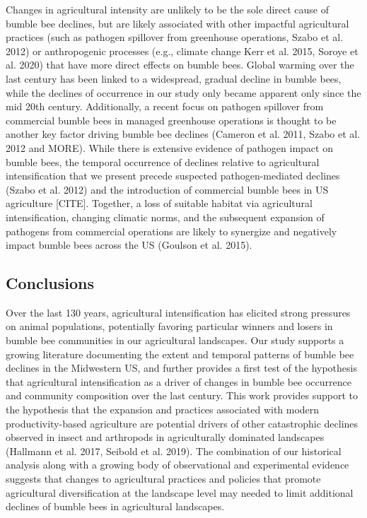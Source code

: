 \documentclass[11pt,]{article}
\begin{document}
Changes in agricultural intensity are unlikely to be the sole direct
cause of bumble bee declines, but are likely associated with other
impactful agricultural practices (such as pathogen spillover from
greenhouse operations, Szabo et al. 2012) or anthropogenic processes
(e.g., climate change Kerr et al. 2015, Soroye et al. 2020) that have
more direct effects on bumble bees. Global warming over the last century
has been linked to a widespread, gradual decline in bumble bees, while
the declines of occurrence in our study only became apparent only since
the mid 20th century. Additionally, a recent focus on pathogen spillover
from commercial bumble bees in managed greenhouse operations is thought
to be another key factor driving bumble bee declines (Cameron et al.
2011, Szabo et al. 2012 and MORE). While there is extensive evidence of
pathogen impact on bumble bees, the temporal occurrence of declines
relative to agricultural intensification that we present precede
suspected pathogen-mediated declines (Szabo et al. 2012) and the
introduction of commercial bumble bees in US agriculture {[}CITE{]}.
Together, a loss of suitable habitat via agricultural intensification,
changing climatic norms, and the subsequent expansion of pathogens from
commercial operations are likely to synergize and negatively impact
bumble bees across the US (Goulson et al. 2015).

\hypertarget{conclusions}{%
\subsection{Conclusions}\label{conclusions}}

Over the last 130 years, agricultural intensification has elicited
strong pressures on animal populations, potentially favoring particular
winners and losers in bumble bee communities in our agricultural
landscapes. Our study supports a growing literature documenting the
extent and temporal patterns of bumble bee declines in the Midwestern
US, and further provides a first test of the hypothesis that
agricultural intensification as a driver of changes in bumble bee
occurrence and community composition over the last century. This work
provides support to the hypothesis that the expansion and practices
associated with modern productivity-based agriculture are potential
drivers of other catastrophic declines observed in insect and arthropods
in agriculturally dominated landscapes (Hallmann et al. 2017, Seibold et
al. 2019). The combination of our historical analysis along with a
growing body of observational and experimental evidence suggests that
changes to agricultural practices and policies that promote agricultural
diversification at the landscape level may needed to limit additional
declines of bumble bees in agricultural landscapes.
\end{document}
